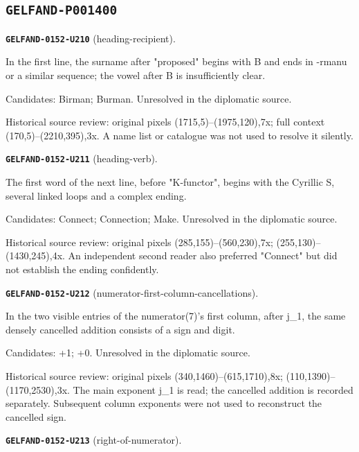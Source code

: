 \subsection*{\texttt{GELFAND-P001400}}
\par\noindent\leavevmode{}\label{GELFAND-0152-U210}\textbf{\texttt{GELFAND-0152-U210}} (heading-recipient).\nopagebreak[4]\par
In the first line, the surname after "proposed" begins with B and ends in -rmanu or a similar sequence; the vowel after B is insufficiently clear.\par
Candidates: Birman; Burman. Unresolved in the diplomatic source.\par
Historical source review: original pixels (1715,5)–(1975,120),7x; full context (170,5)–(2210,395),3x. A name list or catalogue was not used to resolve it silently.\par\medskip
\par\noindent\leavevmode{}\label{GELFAND-0152-U211}\textbf{\texttt{GELFAND-0152-U211}} (heading-verb).\nopagebreak[4]\par
The first word of the next line, before "K-functor", begins with the Cyrillic S, several linked loops and a complex ending.\par
Candidates: Connect; Connection; Make. Unresolved in the diplomatic source.\par
Historical source review: original pixels (285,155)–(560,230),7x; (255,130)–(1430,245),4x. An independent second reader also preferred "Connect" but did not establish the ending confidently.\par\medskip
\par\noindent\leavevmode{}\label{GELFAND-0152-U212}\textbf{\texttt{GELFAND-0152-U212}} (numerator-first-column-cancellations).\nopagebreak[4]\par
In the two visible entries of the numerator(7)'s first column, after j\_1, the same densely cancelled addition consists of a sign and digit.\par
Candidates: +1; +0. Unresolved in the diplomatic source.\par
Historical source review: original pixels (340,1460)–(615,1710),8x; (110,1390)–(1170,2530),3x. The main exponent j\_1 is read; the cancelled addition is recorded separately. Subsequent column exponents were not used to reconstruct the cancelled sign.\par\medskip
\par\noindent\leavevmode{}\label{GELFAND-0152-U213}\textbf{\texttt{GELFAND-0152-U213}} (right-of-numerator).\nopagebreak[4]\par
